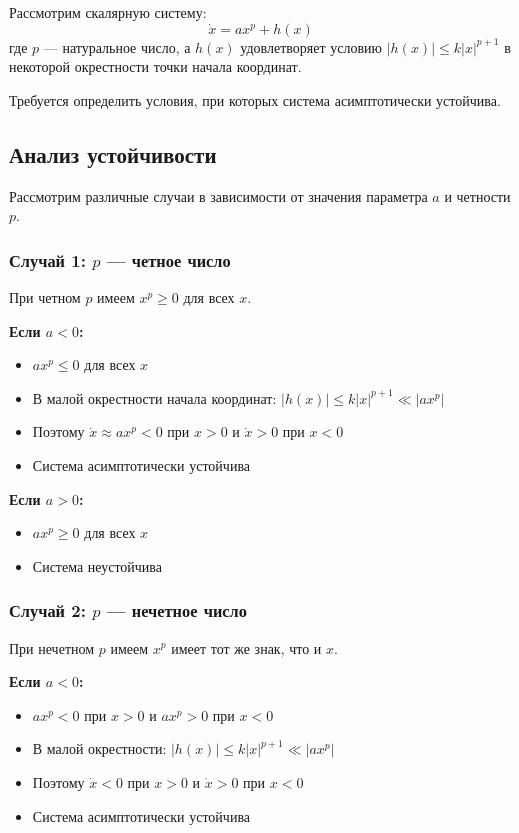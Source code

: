 Рассмотрим скалярную систему:
\begin{equation}
\dot{x} = ax^p + h(x)
\end{equation}
где $p$ — натуральное число, а $h(x)$ удовлетворяет условию $|h(x)| \leq k|x|^{p+1}$ в некоторой окрестности точки начала координат.

Требуется определить условия, при которых система асимптотически устойчива.

\subsection{Анализ устойчивости}

Рассмотрим различные случаи в зависимости от значения параметра $a$ и четности $p$.

\subsubsection{Случай 1: $p$ — четное число}

При четном $p$ имеем $x^p \geq 0$ для всех $x$.

\textbf{Если $a < 0$:}
\begin{itemize}
\item $ax^p \leq 0$ для всех $x$
\item В малой окрестности начала координат: $|h(x)| \leq k|x|^{p+1} \ll |ax^p|$
\item Поэтому $\dot{x} \approx ax^p < 0$ при $x > 0$ и $\dot{x} > 0$ при $x < 0$
\item Система асимптотически устойчива
\end{itemize}

\textbf{Если $a > 0$:}
\begin{itemize}
\item $ax^p \geq 0$ для всех $x$
\item Система неустойчива
\end{itemize}

\subsubsection{Случай 2: $p$ — нечетное число}

При нечетном $p$ имеем $x^p$ имеет тот же знак, что и $x$.

\textbf{Если $a < 0$:}
\begin{itemize}
\item $ax^p < 0$ при $x > 0$ и $ax^p > 0$ при $x < 0$
\item В малой окрестности: $|h(x)| \leq k|x|^{p+1} \ll |ax^p|$
\item Поэтому $\dot{x} < 0$ при $x > 0$ и $\dot{x} > 0$ при $x < 0$
\item Система асимптотически устойчива
\end{itemize}

